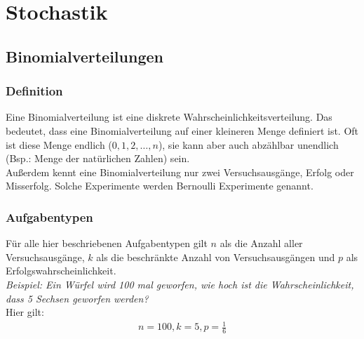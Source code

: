 \chapter{Stochastik}

\section{Binomialverteilungen}
\subsection{Definition}
\begin{flushleft}
    Eine Binomialverteilung ist eine diskrete Wahrscheinlichkeitsverteilung. Das bedeutet, dass eine Binomialverteilung
    auf einer kleineren Menge definiert ist. Oft ist diese Menge endlich (${0,1,2,\dots,n}$), sie kann aber auch abzählbar
    unendlich (Bsp.: Menge der natürlichen Zahlen) sein. \\
    Außerdem kennt eine Binomialverteilung nur zwei Versuchsausgänge, Erfolg oder Misserfolg. Solche Experimente werden Bernoulli
    Experimente genannt.
\end{flushleft}

\subsection{Aufgabentypen}
\begin{flushleft}
    Für alle hier beschriebenen Aufgabentypen gilt $n$ als die Anzahl aller Versuchsausgänge, $k$ als die beschränkte Anzahl von
    Versuchsausgängen und $p$ als Erfolgswahrscheinlichkeit. \\
    \textit{Beispiel: Ein Würfel wird 100 mal geworfen, wie hoch ist die Wahrscheinlichkeit, dass 5 Sechsen geworfen werden?} \\
    Hier gilt:
    \begin{align}
        n=100,k=5,p=\frac{1}{6}
    \end{align}
\end{flushleft}

